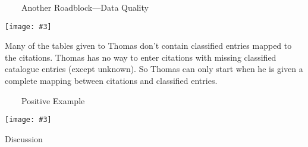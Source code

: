 \documentclass[aspectratio=1610]{beamer}
\newcommand{\imageslide}[4][]
{
\begin{frame}[plain]{~~~~#2}
\vspace{0.2em}
\begin{center}
\centering\texttt{[image: \#3]}
\end{center}
#1
\note{#4}
\end{frame}
}
\begin{document}
\imageslide[Many of the tables given to Thomas don't contain classified entries mapped to the citations. Thomas has no way to enter citations with missing classified catalogue entries (except unknown). So Thomas can only start when he is given a complete mapping between citations and classified entries.]{Another Roadblock---Data Quality}{img/missing-mappings.png}{}

\imageslide{Positive Example}{img/positive-example.png}{}

\begin{frame}{Discussion}
\end{frame}
\end{document}
